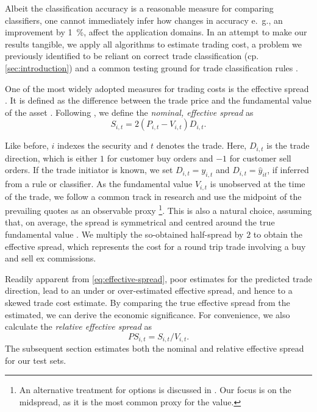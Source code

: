 Albeit the classification accuracy is a reasonable measure for comparing classifiers, one cannot immediately infer how changes in accuracy e.~g., an improvement by \SI{1}{\percent}, affect the application domains. In an attempt to make our results tangible, we apply all algorithms to estimate trading cost, a problem we previously identified to be reliant on correct trade classification (cp. \cref{sec:introduction}) and a common testing ground for trade classification rules \autocites[cp.][541]{ellisAccuracyTradeClassification2000}[][569]{finucaneDirectTestMethods2000}[][271--278]{petersonEvaluationBiasesExecution2003}[][896--897]{savickasInferringDirectionOption2003}.

One of the most widely adopted measures for trading costs is the effective spread \autocite[][112]{Piwowar_2006}. It is defined as the difference between the trade price and the fundamental value of the asset \autocite[][238--239]{bessembinderIssuesAssessingTrade2003}. Following \textcite[][238--239]{bessembinderIssuesAssessingTrade2003}, we define the \emph{nominal, effective spread} as
\begin{equation}
    S_{i,t} = 2 (P_{i,t} - V_{i,t}) D_{i,t}.
    \label{eq:effective-spread}
\end{equation}

Like before, $i$ indexes the security and $t$ denotes the trade. Here, $D_{i,t}$ is the trade direction, which is either $1$ for customer buy orders and $-1$ for customer sell orders. If the trade initiator is known, we set $D_{i,t} = y_{i,t}$ and $D_{i,t}=\hat{y}_{it}$, if inferred from a rule or classifier. As the fundamental value $V_{i,t}$ is unobserved at the time of the trade, we follow a common track in research and use the midpoint of the prevailing quotes as an observable proxy \footnote{An alternative treatment for options is discussed in \textcite[][4975--4976]{muravyevOptionsTradingCosts2020}. Our focus is on the midspread, as it is the most common proxy for the value.}. This is also a natural choice, assuming that, on average, the spread is symmetrical and centred around the true fundamental value \autocite[][1018]{leeMarketIntegrationPrice1993}. We multiply the so-obtained half-spread by $2$ to obtain the effective spread, which represents the cost for a round trip trade involving a buy and sell ex commissions.

Readily apparent from \cref{eq:effective-spread}, poor estimates for the predicted trade direction, lead to an under or over-estimated effective spread, and hence to a skewed trade cost estimate. By comparing the true effective spread from the estimated, we can derive the economic significance. For convenience, we also calculate the \emph{relative effective spread} as
\begin{equation}
    {PS}_{i,t} = S_{i,t} / V_{i,t}.
\end{equation}
The subsequent section estimates both the nominal and relative effective spread for our test sets.

